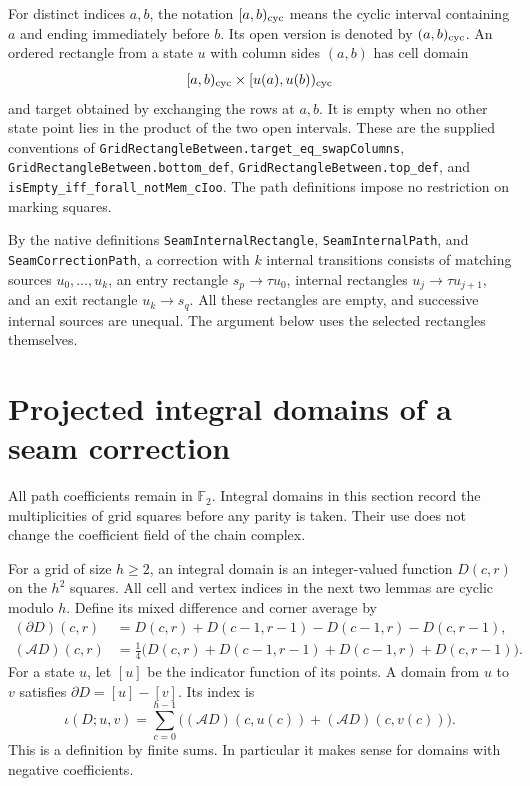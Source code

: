 \documentclass[11pt,oneside]{report}
\theoremstyle{definition}
\numberwithin{equation}{section}
\newcommand{\decl}[1]{\textnormal{\nolinkurl{#1}}}
\begin{document}
For distinct indices $a,b$, the notation $[a,b)_{\rm cyc}$ means the
cyclic interval containing $a$ and ending immediately before $b$.
Its open version is denoted by $(a,b)_{\rm cyc}$.
An ordered rectangle from a state $u$ with column sides $(a,b)$ has
cell domain
\[
 [a,b)_{\rm cyc}\times[u(a),u(b))_{\rm cyc}
\]
and target obtained by exchanging the rows at $a,b$.
It is empty when no other state point lies in the product of the two
open intervals. These are the supplied conventions of
\decl{GridRectangleBetween.target_eq_swapColumns},
\decl{GridRectangleBetween.bottom_def},
\decl{GridRectangleBetween.top_def}, and
\decl{isEmpty_iff_forall_notMem_cIoo}.
The path definitions impose no restriction on marking squares.

By the native definitions \decl{SeamInternalRectangle},
\decl{SeamInternalPath}, and \decl{SeamCorrectionPath}, a correction
with $k$ internal transitions consists of matching sources
$u_0,\ldots,u_k$, an entry rectangle
$s_p\longrightarrow\tau u_0$, internal rectangles
$u_j\longrightarrow\tau u_{j+1}$, and an exit rectangle
$u_k\longrightarrow s_q$.
All these rectangles are empty, and successive internal sources are
unequal. The argument below uses the selected rectangles themselves.

\section{Projected integral domains of a seam correction}

All path coefficients remain in $\mathbb F_2$. Integral domains in this
section record the multiplicities of grid squares before any parity is
taken. Their use does not change the coefficient field of the chain
complex.

For a grid of size $h\ge2$, an integral domain is an integer-valued function
$D(c,r)$ on the $h^2$ squares. All cell and vertex indices in the next
two lemmas are cyclic modulo $h$. Define its mixed difference and corner
average by
\[
 \begin{split}
 (\partial D)(c,r)
 &=D(c,r)+D(c-1,r-1)-D(c-1,r)-D(c,r-1),\\
 (\mathcal A D)(c,r)
 &=\tfrac14\bigl(D(c,r)+D(c-1,r-1)+D(c-1,r)+D(c,r-1)\bigr).
 \end{split}
\]
For a state $u$, let $[u]$ be the indicator function of its points.
A domain from $u$ to $v$ satisfies $\partial D=[u]-[v]$. Its index is
\[
 \iota(D;u,v)=\sum_{c=0}^{h-1}
 \bigl((\mathcal A D)(c,u(c))+(\mathcal A D)(c,v(c))\bigr).
\]
This is a definition by finite sums. In particular it makes sense for
domains with negative coefficients.
\end{document}
